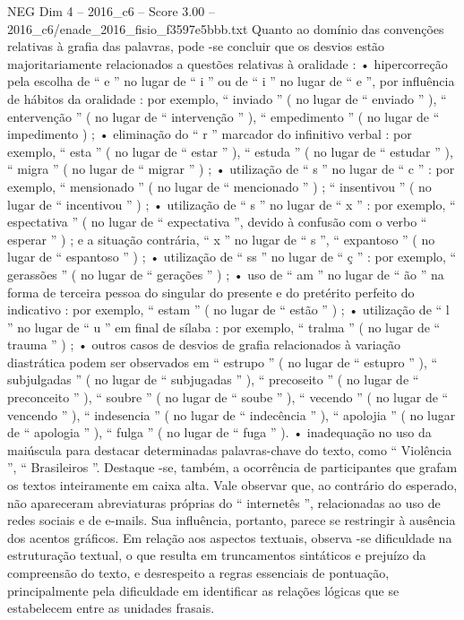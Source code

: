 \begin{textsample}{NEG Dim 4 – 2016\_c6 – Score 3.00 – 2016\_c6/enade\_2016\_fisio\_f3597e5bbb.txt}
Quanto ao domínio das convenções relativas à grafia das palavras, pode -se concluir que os desvios estão majoritariamente relacionados a questões relativas à oralidade : • hipercorreção pela escolha de “ e ” no lugar de “ i ” ou de “ i ” no lugar de “ e ”, por influência de hábitos da oralidade : por exemplo, “ inviado ” ( no lugar de “ enviado ” ), “ entervenção ” ( no lugar de “ intervenção ” ), “ empedimento ” ( no lugar de “ impedimento ) ; • eliminação do “ r ” marcador do infinitivo verbal : por exemplo, “ esta ” ( no lugar de “ estar ” ), “ estuda ” ( no lugar de “ estudar ” ), “ migra ” ( no lugar de “ migrar ” ) ; • utilização de “ s ” no lugar de “ c ” : por exemplo, “ mensionado ” ( no lugar de “ mencionado ” ) ; “ insentivou ” ( no lugar de “ incentivou ” ) ; • utilização de “ s ” no lugar de “ x ” : por exemplo, “ espectativa ” ( no lugar de “ expectativa ”, devido à confusão com o verbo “ esperar ” ) ; e a situação contrária, “ x ” no lugar de “ s ”, “ expantoso ” ( no lugar de “ espantoso ” ) ; • utilização de “ ss ” no lugar de “ ç ” : por exemplo, “ gerassões ” ( no lugar de “ gerações ” ) ; • uso de “ am ” no lugar de “ ão ” na forma de terceira pessoa do singular do presente e do pretérito perfeito do indicativo : por exemplo, “ estam ” ( no lugar de “ estão ” ) ; • utilização de “ l ” no lugar de “ u ” em final de sílaba : por exemplo, “ tralma ” ( no lugar de “ trauma ” ) ; • outros casos de desvios de grafia relacionados à variação diastrática podem ser observados em “ estrupo ” ( no lugar de “ estupro ” ), “ subjulgadas ” ( no lugar de “ subjugadas ” ), “ precoseito ” ( no lugar de “ preconceito ” ), “ soubre ” ( no lugar de “ soube ” ), “ vecendo ” ( no lugar de “ vencendo ” ), “ indesencia ” ( no lugar de “ indecência ” ), “ apolojia ” ( no lugar de “ apologia ” ), “ fulga ” ( no lugar de “ fuga ” ). • inadequação no uso da maiúscula para destacar determinadas palavras-chave do texto, como “ Violência ”, “ Brasileiros ”.
Destaque -se, também, a ocorrência de participantes que grafam os textos inteiramente em caixa alta.
Vale observar que, ao contrário do esperado, não apareceram abreviaturas próprias do “ internetês ”, relacionadas ao uso de redes sociais e de e-mails.
Sua influência, portanto, parece se restringir à ausência dos acentos gráficos.
Em relação aos aspectos textuais, observa -se dificuldade na estruturação textual, o que resulta em truncamentos sintáticos e prejuízo da compreensão do texto, e desrespeito a regras essenciais de pontuação, principalmente pela dificuldade em identificar as relações lógicas que se estabelecem entre as unidades frasais.

\end{textsample}
